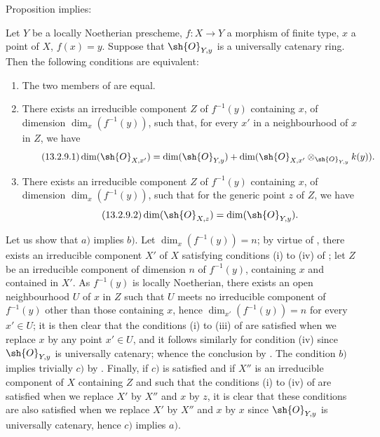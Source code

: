 Proposition  implies:

\begin{corollary}[13.2.9]
\label{IV.13.2.9}
Let $Y$ be a locally Noetherian prescheme, $f:X\to Y$ a morphism of finite type, $x$ a point of $X$, $f(x)=y$.
Suppose that $\sh{O}_{Y,y}$ is a universally catenary ring.
Then the following conditions are equivalent:
\begin{enumerate}[label=\emph{\alph*)}]
  \item The two members of  are equal.
  \item There exists an irreducible component $Z$ of $f^{-1}(y)$ containing $x$, of dimension $\dim_x(f^{-1}(y))$, such that, for every $x'$ in a neighbourhood of $x$ in $Z$, we have
  \[
  \tag{13.2.9.1}
    \dim(\sh{O}_{X,x'})=\dim(\sh{O}_{Y,y})+\dim(\sh{O}_{X,x'}\otimes_{\sh{O}_{Y,y}}k(y)).
  \]
  \item There exists an irreducible component $Z$ of $f^{-1}(y)$ containing $x$, of dimension $\dim_x(f^{-1}(y))$, such that for the generic point $z$ of $Z$, we have
  \[
  \tag{13.2.9.2}
    \dim(\sh{O}_{X,z})=\dim(\sh{O}_{Y,y}).
  \]
\end{enumerate}
\end{corollary}

Let us show that $a)$ implies $b)$.
Let $\dim_x(f^{-1}(y))=n$; by virtue of , there exists an irreducible component $X'$ of $X$ satisfying conditions (i) to (iv) of ; let $Z$ be an irreducible component of dimension $n$ of $f^{-1}(y)$, containing $x$ and contained in $X'$.
As $f^{-1}(y)$ is locally Noetherian, there exists an open neighbourhood $U$ of $x$ in $Z$ such that $U$ meets no irreducible component of $f^{-1}(y)$ other than those containing $x$, hence  $\dim_{x'}(f^{-1}(y))=n$ for every $x'\in U$; it is then clear that the conditions (i) to (iii) of  are satisfied when we replace $x$ by any point $x'\in U$, and it follows similarly for condition (iv) since $\sh{O}_{Y,y}$ is universally catenary; whence the conclusion by .
The condition $b)$ implies trivially $c)$ by .
Finally, if $c)$ is satisfied and if $X''$ is an irreducible component of $X$ containing $Z$ and such that the conditions (i) to (iv) of  are satisfied when we replace $X'$ by $X''$ and $x$ by $z$, it is clear that these conditions are also satisfied when we replace $X'$ by $X''$ and $x$ by $x$ since $\sh{O}_{Y,y}$ is universally catenary, hence $c)$ implies $a)$.


